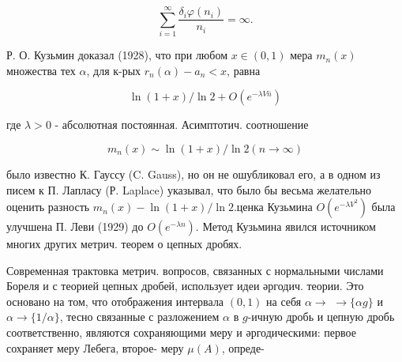 \documentclass[10pt]{article}
\begin{document}
\[

\sum_{i=1}^{\infty} \frac{\delta_{i} \varphi\left(n_{i}\right)}{n_{i}}=\infty .

\]



Р. О. Кузьмин доказал (1928), что при любом $x \in(0,1)$ мера $m_{n}(x)$ множества тех $\alpha$, для к-рых $r_{n}(\alpha)-a_{n}<x$, равна



\[

\ln (1+x) / \ln 2+O\left(e^{-\lambda V \bar{n}}\right)

\]



где $\lambda>0$ - абсолютная постоянная. Асимптотич. соотношение



\[

m_{n}(x) \sim \ln (1+x) / \ln 2(n \longrightarrow \infty)

\]



было известно К. Гауссу (C. Gauss), но он не ошубликовал его, а в одном из писем к П. Лапласу (Р. Laplace) указывал, что было бы весьма желательно оценить разность $m_{n}(x)-\ln (1+x) / \ln 2$.ценка Кузьмина $O\left(e^{-\lambda V^{2}}\right)$ была улучшена П. Леви (1929) до $O\left(e^{-\lambda n}\right)$. Метод Кузьмина явился источником многих других метрич. теорем о цепных дробях.



Современная трактовка метрич. вопросов, связанных с нормальными числами Бореля и с теорией цепных дробей, использует идеи әргодич. теории. Это основано на том, что отображения интервала $(0,1)$ на себя $\alpha \rightarrow$ $\rightarrow\{\alpha g\}$ и $\alpha \rightarrow\{1 / \alpha\}$, тесно связанные с разложением $\alpha$ в $g$-ичную дробь и цепную дробь соответственно, являются сохраняющими меру и әргодическими: первое сохраняет меру Лебега, второе- меру $\mu(A)$, опреде-
\end{document}
